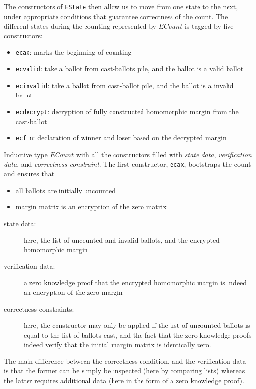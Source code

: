 

\noindent
The constructors of \texttt{EState} then allow us to move from one
state to the next, under appropriate conditions that guarantee
correctness of the count. The different states during the 
counting represented by $ECount$ is tagged by five constructors: 
\begin{itemize}
\item \texttt{ecax}: marks the beginning of counting
\item \texttt{ecvalid}: take a ballot from cast-ballots pile, and the ballot is a valid ballot
\item \texttt{ecinvalid}: take a ballot from cast-ballot pile, and the ballot is a invalid ballot
\item \texttt{ecdecrypt}: decryption of fully constructed homomorphic margin from the cast-ballot
\item \texttt{ecfin}: declaration of winner and loser based on the decrypted margin
\end{itemize}

Inductive type $ECount$ with all the constructors filled with \textit{state data}, 
\textit{verification data}, and \textit{correctness constraint}.  The first constructor, \texttt{ecax}, bootstraps
the count and ensures that 
\begin{itemize}
  \item all ballots are initially uncounted
  \item margin matrix is an encryption of the zero matrix
\end{itemize}

\begin{description}
  \item[state data:] here, the list of uncounted and invalid ballots,
  and the encrypted homomorphic margin
  \item[verification data:] a zero knowledge proof that the encrypted
  homomorphic margin is indeed an encryption of the zero margin
  \item[correctness constraints:] here, the constructor may only be applied if
  the list of uncounted ballots is equal to the list of ballots
  cast, and the fact that the zero knowledge proofs indeed verify
  that the initial margin matrix is identically zero.
\end{description}

\noindent
The main difference between the correctness condition, and the
verification data is that the former can be simply be inspected
(here by comparing lists) whereas the latter requires additional
data (here  in the form of a zero knowledge proof).

